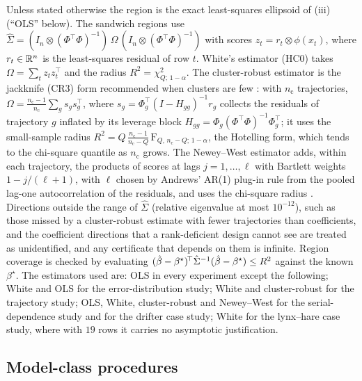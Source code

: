 Unless stated otherwise the region is the exact least-squares ellipsoid of
(iii) (``OLS'' below). The sandwich regions use
$\hat\Sigma = (I_n\otimes (\Phi^{\!\top}\Phi)^{-1})\,\Omega\,(I_n \otimes
(\Phi^{\!\top}\Phi)^{-1})$ with scores $z_t = r_t \otimes \phi(x_t)$, where $r_t \in \mathbb{R}^n$ is the
least-squares residual of row $t$. White's
estimator (HC0) takes $\Omega = \sum_t z_t z_t^{\!\top}$ and the radius $R^2 =
\chi^2_{Q;\,1-\alpha}$. The cluster-robust estimator is the jackknife (CR3) form
recommended when clusters are few \citep{cameron2015practitioner}: with $n_{\mathrm c}$
trajectories, $\Omega = \frac{n_{\mathrm c}-1}{n_{\mathrm c}}\sum_g s_g s_g^{\!\top}$, where $s_g =
\Phi_g^{\!\top}(I - H_{gg})^{-1} r_g$ collects the residuals of trajectory $g$
inflated by its leverage block $H_{gg} =
\Phi_g(\Phi^{\!\top}\Phi)^{-1}\Phi_g^{\!\top}$; it uses the small-sample radius
$R^2 = Q\,\frac{n_{\mathrm c}-1}{n_{\mathrm c}-Q}\,\mathrm{F}_{Q,\,n_{\mathrm c}-Q;\,1-\alpha}$,
the Hotelling form, which tends to the chi-square quantile as $n_{\mathrm c}$
grows. The Newey--West estimator adds, within each trajectory, the products of
scores at lags $j = 1,\dots,\ell$ with Bartlett weights $1 - j/(\ell+1)$, with
$\ell$ chosen by Andrews' AR(1) plug-in rule from the pooled lag-one
autocorrelation of the residuals, and uses the chi-square radius
\citep{newey1987simple,andrews1991heteroskedasticity}. Directions outside the
range of $\hat\Sigma$ (relative eigenvalue at most $10^{-12}$), such as those
missed by a cluster-robust estimate with fewer trajectories than coefficients,
and the coefficient directions that a rank-deficient design cannot see are
treated as unidentified, and any certificate that depends on them is
infinite. Region coverage is checked by evaluating
$(\hat{\beta}-\beta^\star)^{\!\top}\hat\Sigma^{-1}(\hat{\beta}-\beta^\star) \le R^2$ against
the known $\beta^\star$. The estimators used are: OLS in every experiment
except the following; White and OLS for the error-distribution study; White and
cluster-robust for the trajectory study; OLS, White, cluster-robust and
Newey--West for the serial-dependence study and for the drifter case study;
White for the lynx--hare case study, where with $19$ rows it carries no
asymptotic justification.

\subsection{Model-class procedures}
\label{sec:classproc}

